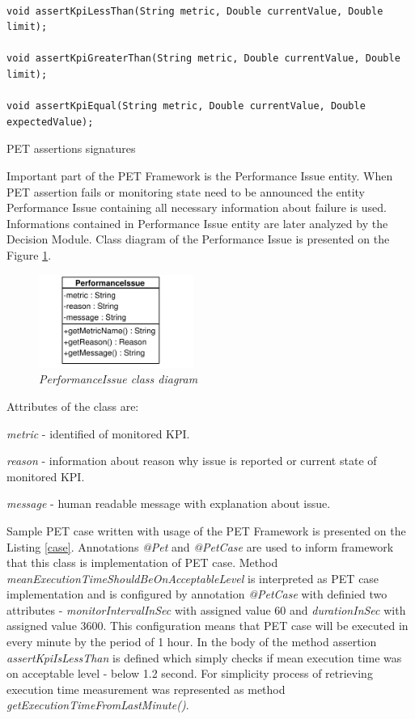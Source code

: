 \documentclass[10pt,a4paper]{article}
\let\tempone\itemize
\let\temptwo\enditemize
\renewenvironment{itemize}{\tempone\addtolength{\itemsep}{-0.4\baselineskip}}{\temptwo}
\begin{document}
\begin{listing}[ht]\begin{verbatim}

void assertKpiLessThan(String metric, Double currentValue, Double limit);

void assertKpiGreaterThan(String metric, Double currentValue, Double limit);

void assertKpiEqual(String metric, Double currentValue, Double expectedValue);
\end{verbatim}
\caption{PET assertions signatures} \label{assertions}
\end{listing}

Important part of the PET Framework is the Performance Issue entity. When PET assertion fails or monitoring state need to be announced the entity Performance Issue containing all necessary information about failure is used. Informations contained in Performance Issue entity are later analyzed by the Decision Module. Class diagram of the Performance Issue is presented on the Figure \ref{issue}.

\begin{figure}[!htb]
\centering
\includegraphics[width=0.45\textwidth]{PerformanceIssueClassDiagram}
\caption{\textit{PerformanceIssue class diagram}} \label{issue}
\end{figure}
 
Attributes of the class are: 
\begin{itemize}
\item \textit{metric} - identified of monitored KPI.
\item \textit{reason} - information about reason why issue is reported or current state of monitored KPI.
\item \textit{message} - human readable message with explanation about issue.
\end{itemize}

Sample PET case written with usage of the PET Framework is presented on the Listing \ref{case}. Annotations \textit{@Pet} and \textit{@PetCase} are used to inform framework that this class is implementation of PET case. Method  \textit{meanExecutionTimeShouldBeOnAcceptableLevel} is interpreted as PET case implementation and is configured by annotation \textit{@PetCase} with definied two attributes - \textit{monitorIntervalInSec} with assigned value 60 and \textit{durationInSec} with assigned value 3600. This configuration means that PET case will be executed in every minute by the period of 1 hour. In the body of the method assertion \textit{assertKpiIsLessThan} is defined which simply checks if mean execution time was on acceptable level - below 1.2 second. For simplicity process of retrieving execution time measurement was represented as method  \textit{getExecutionTimeFromLastMinute()}.  
\end{document}
